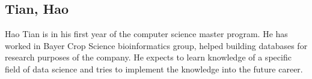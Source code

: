 \subsection{Tian, Hao}

Hao Tian is in his first year of the computer science master program. 
He has worked in Bayer Crop Science bioinformatics group, helped building databases for research purposes of the company. 
He expects to learn knowledge of a specific field of data science and tries to implement the knowledge into the future career.
